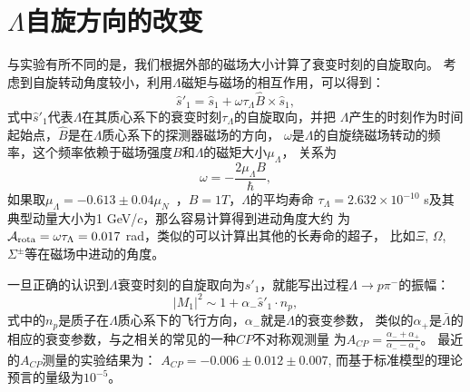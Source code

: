 \section{$\Lambda$自旋方向的改变}
与实验\cite{Ablikim:2018zay}有所不同的是，我们根据外部的磁场大小计算了衰变时刻的自旋取向。
考虑到自旋转动角度较小，利用$\Lambda$磁矩与磁场的相互作用\cite{Sakurai:2011zz}，可以得到：
\begin{equation}
\label{eq:retate-s-sp}
    \hat{s}'_{1} = \hat{s}_{1} + \omega \tau_{\Lambda} \hat{B}  \times
    \hat{s}_{1},
\end{equation}
式中$\hat{s}'_{1}$代表$\Lambda$在其质心系下的衰变时刻$\tau_{\Lambda}$的自旋取向，并把
$\Lambda$产生的时刻作为时间起始点，$\hat{B}$是在$\Lambda$质心系下的探测器磁场的方向，
$\omega$是$\Lambda$的自旋绕磁场转动的频率，这个频率依赖于磁场强度$B$和$\Lambda$的磁矩大小$\mu_{\Lambda}$，
关系为
\begin{equation}
    \omega  = - \frac{2 \mu_{\Lambda} B}{\hbar},
\end{equation}
如果取$\mu_{\Lambda} = -0.613 \pm 0.04 \mu_{N}$~\cite{PDG}，$B=1T$，$\Lambda$的平均寿命
$\tau_{\Lambda} = 2.632 \times 10^{-10}$ s及其典型动量大小为1 GeV/$c$，那么容易计算得到进动角度大约
为$\mathcal{A}_{\rm rota} = \omega \tau_{\Lambda} =0.017$ rad，类似的可以计算出其他的长寿命的超子，
比如$\Xi$, $\Omega$, $\Sigma^{\pm}$等在磁场中进动的角度。

一旦正确的认识到$\Lambda$衰变时刻的自旋取向为$\hat{s}'_{1}$，就能写出过程$\Lambda \to p \pi^-$的振幅：
\begin{equation}
    |M_{1}|^{2} \sim 1 + \alpha_{-} \hat{s}'_{1} \cdot n_{p},
\end{equation}
式中的$n_p$是质子在$\Lambda$质心系下的飞行方向，$\alpha_{-}$就是$\Lambda$的衰变参数，
类似的$\alpha_{+}$是$\bar{\Lambda}$的相应的衰变参数，与之相关的常见的一种$CP$不对称观测量
为$A_{CP} = \frac{\alpha_{-} + \alpha_{+}}{\alpha_{-}- \alpha_{+}}$。 最近的$A_{CP}$测量的实验结果为：
$A_{CP} = -0.006 \pm 0.012 \pm 0.007$\cite{Ablikim:2018zay},  而基于标准模型的理论
预言的量级为$10^{-5}$\cite{Donoghue:1986hh, Tandean:2002vy}。

